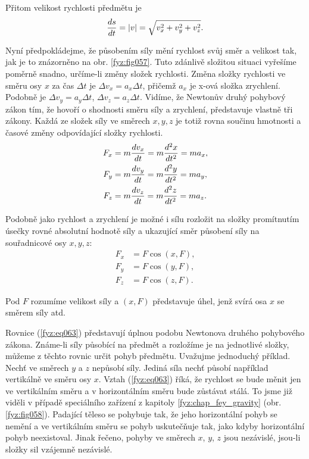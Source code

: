 {    Přitom velikost rychlosti předmětu je
    \begin{equation}\label{fyz:eq062}
      \frac{d s}{d t} = \left\lvert v\right\rvert = \sqrt{v^2_x + v^2_y + v^2_z}. 
    \end{equation}
    
    Nyní předpokládejme, že působením síly mění rychlost svůj směr a velikost tak, jak je to 
    znázorněno na obr. \ref{fyz:fig057}. Tuto zdánlivě složitou situaci vyřešíme poměrně snadno, 
    určíme-li změny složek rychlosti. Změna složky rychlosti ve směru osy \(x\) za čas \(\Delta t\) 
    je \(\Delta v_x = a_x\Delta t\), přičemž \(a_x\) je x-ová složka zrychlení. Podobně je \(\Delta 
    v_y = a_y\Delta t\), \(\Delta v_z = a_z\Delta t\). Vidíme, že Newtonův druhý pohybový 
    zákon tím, že hovoří o shodnosti směru síly a zrychlení, představuje vlastně tři zákony. Každá 
    ze složek síly ve směrech \(x, y, z\) je totiž rovna součinu hmotnosti a časové změny 
    odpovídající složky rychlosti.
    \begin{subequations}\label{fyz:eq063}
      \begin{align}
        F_x &= m\frac{d v_x}{d t} = m\frac{d^2 x}{d t^2} = ma_x, \\
        F_y &= m\frac{d v_y}{d t} = m\frac{d^2 y}{d t^2} = ma_y, \\
        F_z &= m\frac{d v_z}{d t} = m\frac{d^2 z}{d t^2} = ma_z. 
      \end{align}
    \end{subequations}
    
    Podobně jako rychlost a zrychlení je možné i sílu rozložit na složky promítnutím úsečky rovné 
    absolutní hodnotě síly a ukazující směr působení síly na souřadnicové osy \(x, y, z\):
    \begin{subequations}\label{fyz:eq064}
      \begin{align}
        F_x &= F\cos(x,F),\\
        F_y &= F\cos(y,F),\\
        F_z &= F\cos(z,F).
      \end{align}
    \end{subequations}

    Pod \(F\) rozumíme velikost síly a \((x, F)\) představuje úhel, jenž svírá osa \(x\) se směrem 
    síly atd.
    
    Rovnice (\ref{fyz:eq063}) představují úplnou podobu Newtonova druhého pohybového zákona. 
    Známe-li síly působící na předmět a rozložíme je na jednotlivé složky, můžeme z těchto rovnic 
    určit pohyb předmětu. Uvažujme jednoduchý příklad. Nechť ve směrech \(y\) a \(z\) nepůsobí 
    síly. Jediná síla nechť působí například vertikálně ve směru osy \(x\). Vztah (\ref{fyz:eq063}) 
    říká, že rychlost se bude měnit jen ve vertikálním směru a v horizontálním směru bude zůstávat 
    stálá. To jsme již viděli v případě speciálního zařízení z kapitoly \ref{fyz:chap_fey_gravity} 
    (obr. \ref{fyz:fig058}). Padající těleso se pohybuje tak, že jeho horizontální pohyb se nemění 
    a ve vertikálním směru se pohyb uskutečňuje tak, jako kdyby horizontální pohyb neexistoval. 
    Jinak řečeno, pohyby ve směrech \(x\), \(y\), \(z\) jsou nezávislé, jsou-li složky sil vzájemně 
    nezávislé.
    
}
